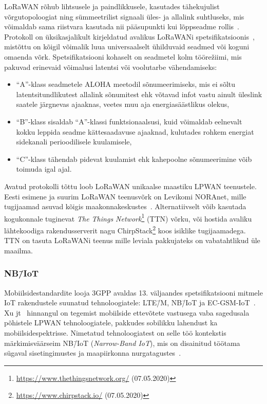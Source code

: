\documentclass[12pt]{article}
\begin{document}
    LoRaWAN rõhub lihtsusele ja paindlikkusele, kasutades tähekujulist võrgutopoloogiat ning sümmeetrilist signaali üles- ja allalink suhtluseks, mis võimaldab sama riistvara kasutada nii pääsupunkti kui lõppseadme rollis~\cite{lorawanIntro}.
    Protokoll on üksikasjalikult kirjeldatud avalikus LoRaWANi spetsifikatsioonis~\cite{lorawanspec}, mistõttu on kõigil võimalik luua universaalselt ühilduvaid seadmed või koguni omaenda võrk.
    Spetsifikatsiooni kohaselt on seadmetel kolm töörežiimi, mis pakuvad erinevaid võimalusi latentsi või voolutarbe vähendamiseks:
    \begin{itemize}
        \item "`A"'-klass seadmetele ALOHA meetodil sõnumeerimiseks, mis ei sõltu latentsitundlikutest allalink sõnumitest ehk võtavad infot vastu ainult üleslink saatele järgnevas ajaaknas, veetes muu aja energiasäästlikus olekus,
        \item "`B"'-klass sisaldab "`A"'-klassi funktsionaalsusi, kuid võimaldab eelnevalt kokku leppida seadme kättesaadavuse ajaaknad, kulutades rohkem energiat sidekanali perioodilisele kuulamisele,
        \item "`C"'-klass tähendab pidevat kuulamist ehk kahepoolne sõnumeerimine võib toimuda igal ajal.
    \end{itemize}

    Avatud protokolli tõttu loob LoRaWAN unikaalse maastiku LPWAN teenustele.
    Eesti esimene ja suurim LoRaWAN teenusvõrk on Levikomi NORAnet, mille tugijaamad asuvad kõigis maakonnakeskustes~\cite{noranetuudis}.
    Alternatiivselt võib kasutada kogukonnale tuginevat \textit{The Things Network}\footnote{\url{https://www.thethingsnetwork.org/} (07.05.2020)} (TTN) võrku, või hostida avaliku lähtekoodiga rakendusserverit nagu ChirpStack\footnote{\url{https://www.chirpstack.io/} (07.05.2020)} koos isiklike tugijaamadega.
    TTN on tasuta LoRaWANi teenus mille leviala pakkujateks on vabatahtlikud üle maailma.

    \subsubsection{NB\=/IoT}

    Mobiilsidestandardite looja 3GPP avaldas 13. väljaandes spetsifikatsiooni mitmele IoT rakendustele suunatud tehnoloogiatele: LTE\=/M, NB\=/IoT ja EC-GSM-IoT~\cite{3gppiot}.
    Xu jt~\cite{xuyao} hinnangul on tegemist mobiilside ettevõtete vastusega vaba sagedusala põhistele LPWAN tehnoloogiatele, pakkudes sobilikku lahendust ka mobiilsidespektrisse.
    Nimetatud tehnoloogiatest on selle töö kontekstis märkimisväärseim NB\=/IoT (\textit{Narrow-Band IoT}), mis on disainitud töötama sügaval sisetingimustes ja maapiirkonna nurgatagustes~\cite{martinez}.
\end{document}
